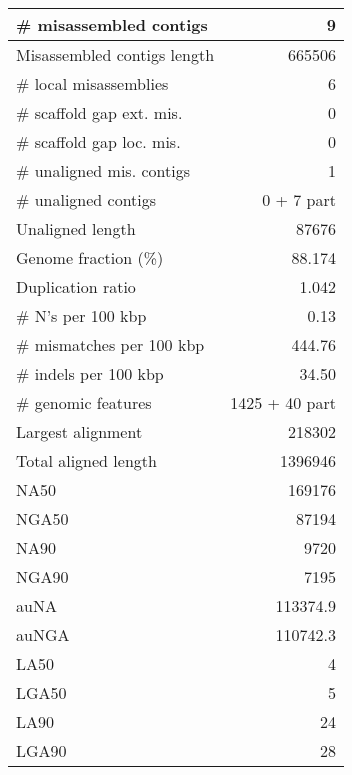 \documentclass[12pt,a4paper]{article}
\begin{document}
\begin{table}[ht]
\begin{center}
\begin{tabular}{|l*{1}{|r}|}
\# misassembled contigs & 9 \\ \hline
Misassembled contigs length & 665506 \\ \hline
\# local misassemblies & 6 \\ \hline
\# scaffold gap ext. mis. & 0 \\ \hline
\# scaffold gap loc. mis. & 0 \\ \hline
\# unaligned mis. contigs & 1 \\ \hline
\# unaligned contigs & 0 + 7 part \\ \hline
Unaligned length & 87676 \\ \hline
Genome fraction (\%) & 88.174 \\ \hline
Duplication ratio & 1.042 \\ \hline
\# N's per 100 kbp & 0.13 \\ \hline
\# mismatches per 100 kbp & 444.76 \\ \hline
\# indels per 100 kbp & 34.50 \\ \hline
\# genomic features & 1425 + 40 part \\ \hline
Largest alignment & 218302 \\ \hline
Total aligned length & 1396946 \\ \hline
NA50 & 169176 \\ \hline
NGA50 & 87194 \\ \hline
NA90 & 9720 \\ \hline
NGA90 & 7195 \\ \hline
auNA & 113374.9 \\ \hline
auNGA & 110742.3 \\ \hline
LA50 & 4 \\ \hline
LGA50 & 5 \\ \hline
LA90 & 24 \\ \hline
LGA90 & 28 \\ \hline
\end{tabular}
\end{center}
\end{table}
\end{document}
